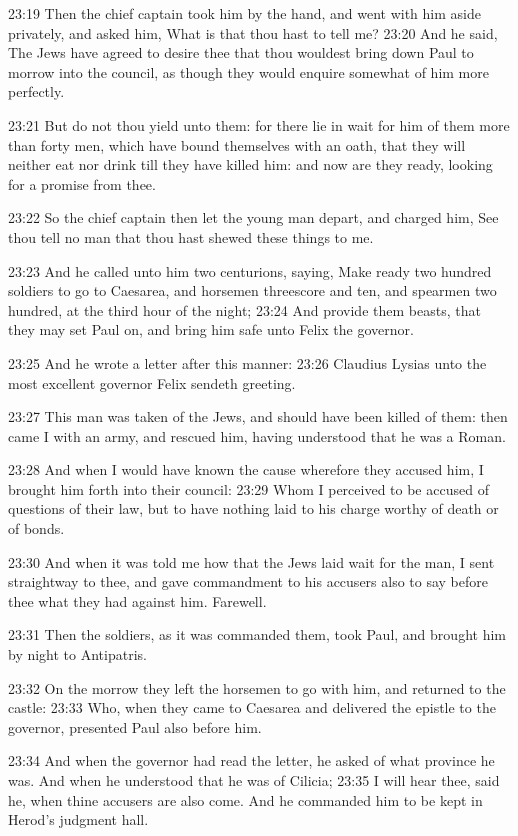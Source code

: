 23:19 Then the chief captain took him by the hand, and went with him aside privately, and asked him, What is that thou hast to tell me?  23:20 And he said, The Jews have agreed to desire thee that thou wouldest bring down Paul to morrow into the council, as though they would enquire somewhat of him more perfectly.

23:21 But do not thou yield unto them: for there lie in wait for him of them more than forty men, which have bound themselves with an oath, that they will neither eat nor drink till they have killed him: and now are they ready, looking for a promise from thee.

23:22 So the chief captain then let the young man depart, and charged him, See thou tell no man that thou hast shewed these things to me.

23:23 And he called unto him two centurions, saying, Make ready two hundred soldiers to go to Caesarea, and horsemen threescore and ten, and spearmen two hundred, at the third hour of the night; 23:24 And provide them beasts, that they may set Paul on, and bring him safe unto Felix the governor.

23:25 And he wrote a letter after this manner: 23:26 Claudius Lysias unto the most excellent governor Felix sendeth greeting.

23:27 This man was taken of the Jews, and should have been killed of them: then came I with an army, and rescued him, having understood that he was a Roman.

23:28 And when I would have known the cause wherefore they accused him, I brought him forth into their council: 23:29 Whom I perceived to be accused of questions of their law, but to have nothing laid to his charge worthy of death or of bonds.

23:30 And when it was told me how that the Jews laid wait for the man, I sent straightway to thee, and gave commandment to his accusers also to say before thee what they had against him. Farewell.

23:31 Then the soldiers, as it was commanded them, took Paul, and brought him by night to Antipatris.

23:32 On the morrow they left the horsemen to go with him, and returned to the castle: 23:33 Who, when they came to Caesarea and delivered the epistle to the governor, presented Paul also before him.

23:34 And when the governor had read the letter, he asked of what province he was. And when he understood that he was of Cilicia; 23:35 I will hear thee, said he, when thine accusers are also come. And he commanded him to be kept in Herod's judgment hall.

